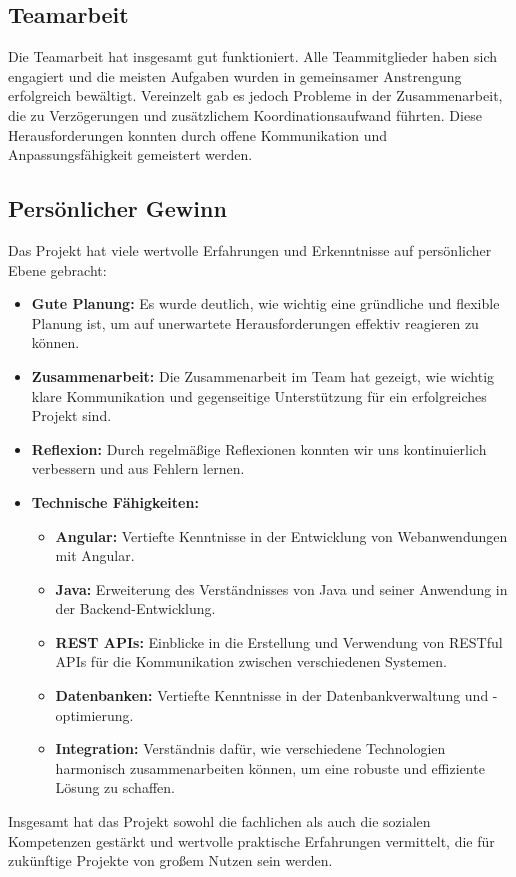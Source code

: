 \subsection*{Teamarbeit}

Die Teamarbeit hat insgesamt gut funktioniert. Alle Teammitglieder haben sich engagiert und die meisten Aufgaben wurden in gemeinsamer Anstrengung erfolgreich bewältigt. Vereinzelt gab es jedoch Probleme in der Zusammenarbeit, die zu Verzögerungen und zusätzlichem Koordinationsaufwand führten. Diese Herausforderungen konnten durch offene Kommunikation und Anpassungsfähigkeit gemeistert werden.

\subsection*{Persönlicher Gewinn}

Das Projekt hat viele wertvolle Erfahrungen und Erkenntnisse auf persönlicher Ebene gebracht:

\begin{itemize}
    \item \textbf{Gute Planung:} Es wurde deutlich, wie wichtig eine gründliche und flexible Planung ist, um auf unerwartete Herausforderungen effektiv reagieren zu können.
    \item \textbf{Zusammenarbeit:} Die Zusammenarbeit im Team hat gezeigt, wie wichtig klare Kommunikation und gegenseitige Unterstützung für ein erfolgreiches Projekt sind.
    \item \textbf{Reflexion:} Durch regelmäßige Reflexionen konnten wir uns kontinuierlich verbessern und aus Fehlern lernen.
    \item \textbf{Technische Fähigkeiten:}
    \begin{itemize}
        \item \textbf{Angular:} Vertiefte Kenntnisse in der Entwicklung von Webanwendungen mit Angular.
        \item \textbf{Java:} Erweiterung des Verständnisses von Java und seiner Anwendung in der Backend-Entwicklung.
        \item \textbf{REST APIs:} Einblicke in die Erstellung und Verwendung von RESTful APIs für die Kommunikation zwischen verschiedenen Systemen.
        \item \textbf{Datenbanken:} Vertiefte Kenntnisse in der Datenbankverwaltung und -optimierung.
        \item \textbf{Integration:} Verständnis dafür, wie verschiedene Technologien harmonisch zusammenarbeiten können, um eine robuste und effiziente Lösung zu schaffen.
    \end{itemize}
\end{itemize}

Insgesamt hat das Projekt sowohl die fachlichen als auch die sozialen Kompetenzen gestärkt und wertvolle praktische Erfahrungen vermittelt, die für zukünftige Projekte von großem Nutzen sein werden.